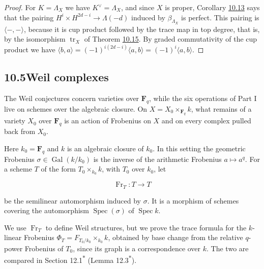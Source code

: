 \documentclass[11pt]{article}
\newcommand{\bpout}[1]{#1\textsuperscript{\hyperlink{bp-outside}{\ensuremath{\ast}}}}
\begin{document}
\begin{proof}[{Proof}]\label{bp53}%
For \(K=\Lambda_X\) we have \(K^\vee=\Lambda_X\), and since \(X\) is proper, Corollary \hyperref[bp40]{10.13} says that the pairing \(H^i\times H^{2d-i}\to\Lambda(-d)\) induced by \(\beta_{\Lambda_X}\) is perfect. This pairing is \(\langle-,-\rangle\), because it is cup product followed by the trace map in top degree, that is, by the isomorphism \(\operatorname{tr}_X\) of Theorem \hyperref[bp46]{10.15}. By graded commutativity of the cup product we have \(\langle b,a\rangle=(-1)^{i(2d-i)}\langle a,b\rangle
=(-1)^i\langle a,b\rangle\).
\end{proof}


\subsection*{\texorpdfstring{10.5\quad Weil complexes}{10.5 Weil complexes}}
\label{bp54}%
\label{bp55}%
The Weil conjectures concern varieties over \(\mathbf F_q\), while the six operations of Part I live on schemes over the algebraic closure. On \(X=X_0\times_{\mathbf F_q}k\), what remains of a variety \(X_0\) over \(\mathbf F_q\) is an action of Frobenius on \(X\) and on every complex pulled back from \(X_0\).

Here \(k_0=\mathbf F_q\) and \(k\) is an algebraic closure of \(k_0\). In this setting the geometric Frobenius \(\sigma\in\operatorname{Gal}(k/k_0)\) is the inverse of the arithmetic Frobenius \(a\mapsto a^q\). For a scheme \(T\) of the form \(T_0\times_{k_0}k\), with \(T_0\) over \(k_0\), let

\[
\operatorname{Fr}_T:T\longrightarrow T
\]

be the semilinear automorphism induced by \(\sigma\). It is a morphism of schemes covering the automorphism \(\operatorname{Spec}(\sigma)\) of \(\operatorname{Spec}k\).

We use \(\operatorname{Fr}_T\) to define Weil structures, but we prove the trace formula for the \(k\)-linear Frobenius \(\Phi_T=F_{T_0/k_0}\times_{k_0}k\), obtained by base change from the relative \(q\)-power Frobenius of \(T_0\), since its graph is a correspondence over \(k\). The two are compared in Section \bpout{12.1} (Lemma \bpout{12.3}).
\end{document}
